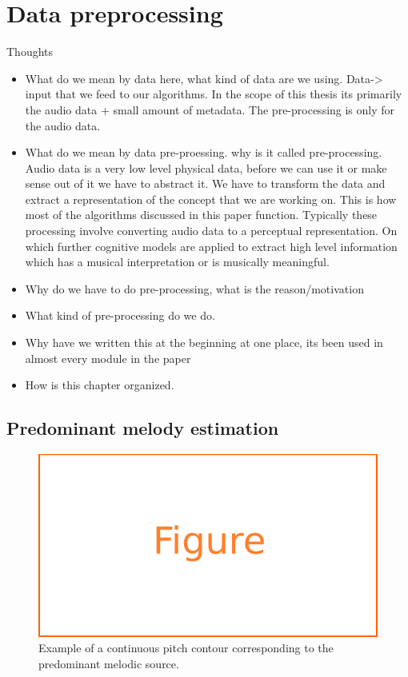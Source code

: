 
\chapter{Data preprocessing}

Thoughts
\begin{itemize}
	\item What do we mean by data here, what kind of data are we using. Data-> input that we feed to our algorithms. In the scope of this thesis its primarily the audio data + small amount of metadata. The pre-processing is only for the audio data. 
	\item What do we mean by data pre-proessing. why is it called pre-processing. Audio data is a very low level physical data, before we can use it or make sense out of it we have to abstract it. We have to transform the data and extract a representation of the concept that we are working on. This is how most of the algorithms discussed in this paper function. Typically these processing involve converting audio data to a perceptual representation. On which further cognitive models are applied to extract high level information which has a musical interpretation or is musically meaningful. 
	\item Why do we have to do pre-processing, what is the reason/motivation
	\item What kind of pre-processing do we do. 
	\item Why have we written this at the beginning at one place, its been used in almost every module in the paper
	\item How is this chapter organized. 
\end{itemize}


\section{Predominant melody estimation}

\begin{figure}
	\begin{center}
		\includegraphics[width=\figSizeEighty]{ch05_preprocessing/figures/figure_todo.pdf}
	\end{center}
	\caption{Example of a continuous pitch contour corresponding to the predominant melodic source.}
	\label{fig:predominant_melodic_fragment}
\end{figure}


